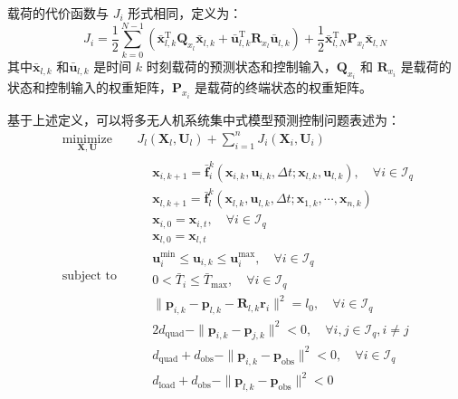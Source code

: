 \documentclass[lang=chs, degree=master, blindreview=true, winfonts=true]{yanputhesis}
\begin{document}
载荷的代价函数与 \( J_i \) 形式相同，定义为：
\begin{equation}
    J_i = \frac{1}{2}\sum_{k=0}^{N-1}\left(\bar{\boldsymbol{x}}_{l,k}^\mathrm{T}\boldsymbol{Q}_{x_l}\bar{\boldsymbol{x}}_{l,k}+\bar{\boldsymbol{u}}_{l,k}^\mathrm{T}\boldsymbol{R}_{x_l}\bar{\boldsymbol{u}}_{l,k}\right)+\frac{1}{2}\bar{\boldsymbol{x}}_{l,N}^\mathrm{T}\boldsymbol{P}_{x_l}\bar{\boldsymbol{x}}_{l,N}
	\label{jpayload}
\end{equation}
其中$\bar{\boldsymbol{x}}_{l,k}$ 和$\bar{\boldsymbol{u}}_{l,k}$ 是时间 $k$ 时刻载荷的预测状态和控制输入，$\boldsymbol{Q}_{x_i}$ 和 $\boldsymbol{R}_{x_i}$ 是载荷的状态和控制输入的权重矩阵，$\boldsymbol{P}_{x_i}$ 是载荷的终端状态的权重矩阵。


基于上述定义，可以将多无人机系统集中式模型预测控制问题表述为：
\begin{equation}
	\begin{aligned} 
	&\operatorname*{minimize}_{\bm{X}, \bm{U}}& & J_l(\bm{X}_l, \bm{U}_l) + \sum_{i=1}^n J_i(\bm{X}_i, \bm{U}_i)  \\
	&\text{subject to}& & \begin{aligned}
	& \bm{x}_{i,k+1} = \bar{\bm{f}}_i^k(\bm{x}_{i,k}, \bm{u}_{i,k}, \Delta t; \bm{x}_{l,k}, \bm{u}_{l,k}), \quad \forall i \in \mathcal{I}_q \\
	& \bm{x}_{l,k+1} = \bar{\bm{f}}_l^k(\bm{x}_{l,k}, \bm{u}_{l,k}, \Delta t; \bm{x}_{1,k}, \cdots, \bm{x}_{n,k}) \\
	& \bm{x}_{i,0} = \bm{x}_{i,t}, \quad \forall i \in \mathcal{I}_q \\
	& \bm{x}_{l,0} = \bm{x}_{l,t} \\
	& \bm{u}_{i}^{\min} \leq \bm{u}_{i,k} \leq \bm{u}_{i}^{\max}, \quad \forall i \in \mathcal{I}_q \\
	& 0 < \bar{T}_i \leq \bar{T}_{\max}, \quad \forall i \in \mathcal{I}_q \\
	& \|\bm{p}_{i,k} - \bm{p}_{l,k} - \bm{R}_{l,k} \bm{r}_i\|^2 = l_0, \quad \forall i \in \mathcal{I}_q \\
	& 2d_\text{quad} - \|\bm{p}_{i,k} - \bm{p}_{j,k}\|^2 < 0, \quad \forall i, j \in \mathcal{I}_q, i \neq j \\
	& d_\text{quad} + d_\text{obs} - \|\bm{p}_{i,k} - \bm{p}_\text{obs}\|^2 < 0, \quad \forall i \in \mathcal{I}_q \\
	& d_\text{load} + d_\text{obs} - \|\bm{p}_{l,k} - \bm{p}_\text{obs}\|^2 < 0        
	\end{aligned}	
\end{aligned}
\label{multimpc}
\end{equation}
\end{document}
